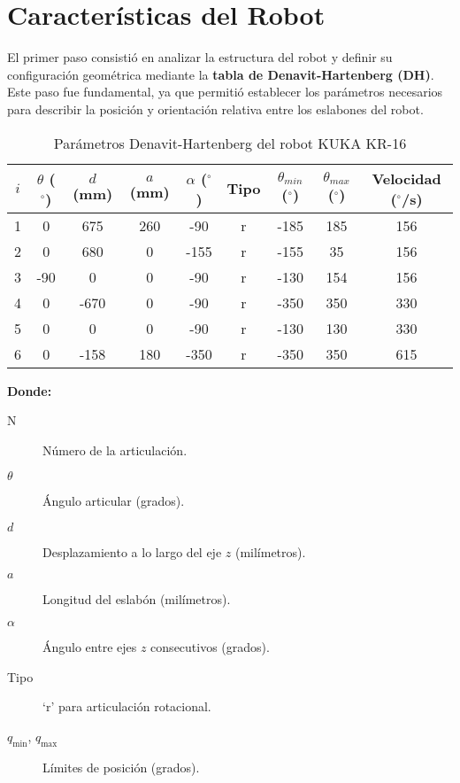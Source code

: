 \section{Características del Robot} \label{sec:caracteristicas_del_robot}

El primer paso consistió en analizar la estructura del robot y definir su configuración geométrica mediante la \textbf{tabla de Denavit-Hartenberg (DH)}. Este paso fue fundamental, ya que permitió establecer los parámetros necesarios para describir la posición y orientación relativa entre los eslabones del robot.

\begin{table}[H]
	\centering
	\caption{Parámetros Denavit-Hartenberg del robot KUKA KR-16}
	\label{tab:dh_kuka}
	\begin{tabular}{c|c|c|c|c|c|c|c|c}
		\toprule
		$i$ & $\theta$ ($^\circ$) & $d$ (mm) & $a$ (mm) & $\alpha$ ($^\circ$) & Tipo & $\theta_{min}$ ($^\circ$) & $\theta_{max}$ ($^\circ$) & Velocidad ($^\circ$/s) \\
		\midrule
		1 & 0    & 675  & 260  & -90  & r & -185 & 185  & 156 \\
		2 & 0    & 680  & 0    & -155 & r & -155 & 35   & 156 \\
		3 & -90  & 0    & 0    & -90  & r & -130 & 154  & 156 \\
		4 & 0    & -670 & 0    & -90  & r & -350 & 350  & 330 \\
		5 & 0    & 0    & 0    & -90  & r & -130 & 130  & 330 \\
		6 & 0    & -158 & 180  & -350 & r & -350 & 350  & 615 \\
		\bottomrule
	\end{tabular}
\end{table}


\bigskip
\noindent
\textbf{Donde:}
\begin{description}
	\item[N] Número de la articulación.
	\item[\(\theta\)] Ángulo articular (grados).
	\item[\(d\)] Desplazamiento a lo largo del eje \(z\) (milímetros).
	\item[\(a\)] Longitud del eslabón (milímetros).
	\item[\(\alpha\)] Ángulo entre ejes \(z\) consecutivos (grados).
	\item[Tipo] ‘r’ para articulación rotacional.
	\item[\(q_{\min}\), \(q_{\max}\)] Límites de posición (grados).

\end{description}


